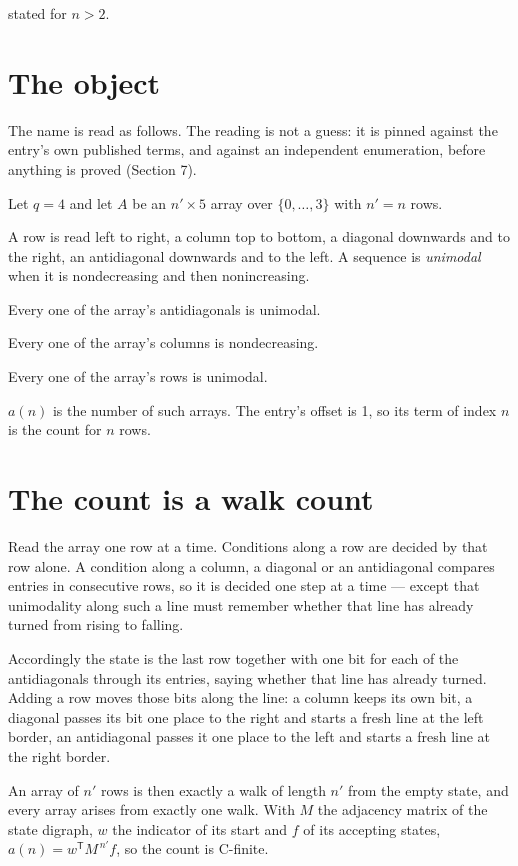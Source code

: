 \documentclass[11pt]{article}
\theoremstyle{definition}
\begin{document}
stated for $n > 2$.

\section{The object}

The name is read as follows. The reading is not a guess: it is pinned against the entry's own published terms, and against an independent enumeration, before anything is proved (Section 7).

Let $q = 4$ and let $A$ be an $n' \times 5$ array over $\{0,\dots,3\}$ with $n' = n$ rows.

A row is read left to right, a column top to bottom, a diagonal downwards and to the right, an antidiagonal downwards and to the left. A sequence is {\itshape unimodal} when it is nondecreasing and then nonincreasing.

Every one of the array's antidiagonals is unimodal.

Every one of the array's columns is nondecreasing.

Every one of the array's rows is unimodal.

$a(n)$ is the number of such arrays. The entry's offset is 1, so its term of index $n$ is the count for $n$ rows.

\section{The count is a walk count}

Read the array one row at a time. Conditions along a row are decided by that row alone. A condition along a column, a diagonal or an antidiagonal compares entries in consecutive rows, so it is decided one step at a time --- except that unimodality along such a line must remember whether that line has already turned from rising to falling.

Accordingly the state is the last row together with one bit for each of the antidiagonals through its entries, saying whether that line has already turned. Adding a row moves those bits along the line: a column keeps its own bit, a diagonal passes its bit one place to the right and starts a fresh line at the left border, an antidiagonal passes it one place to the left and starts a fresh line at the right border.

An array of $n'$ rows is then exactly a walk of length $n'$ from the empty state, and every array arises from exactly one walk. With $M$ the adjacency matrix of the state digraph, $w$ the indicator of its start and $f$ of its accepting states, $a(n) = w^{\mathsf T}M^{\,n'}f$, so the count is C-finite.
\end{document}
